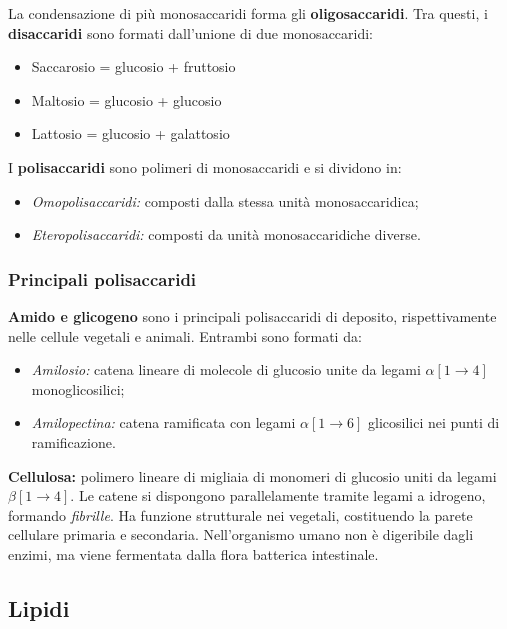 \documentclass[11pt,a4paper,openright,twoside]{book}
\theoremstyle{definition}
\theoremstyle{plain}
\theoremstyle{remark}
\begin{document}
La condensazione di più monosaccaridi forma gli \textbf{oligosaccaridi}. Tra questi, i \textbf{disaccaridi} sono formati dall'unione di due monosaccaridi:
\begin{itemize}
  \item Saccarosio = glucosio + fruttosio
  \item Maltosio = glucosio + glucosio
  \item Lattosio = glucosio + galattosio
\end{itemize}

I \textbf{polisaccaridi} sono polimeri di monosaccaridi e si dividono in:
\begin{itemize}
  \item \textit{Omopolisaccaridi:} composti dalla stessa unità monosaccaridica;
  \item \textit{Eteropolisaccaridi:} composti da unità monosaccaridiche diverse.
\end{itemize}

\subsubsection{Principali polisaccaridi}

\textbf{Amido e glicogeno} sono i principali polisaccaridi di deposito, rispettivamente nelle cellule vegetali e animali. Entrambi sono formati da:
\begin{itemize}
  \item \textit{Amilosio:} catena lineare di molecole di glucosio unite da legami $\alpha[1\!\to\!4]$ monoglicosilici;
  \item \textit{Amilopectina:} catena ramificata con legami $\alpha[1\!\to\!6]$ glicosilici nei punti di ramificazione.
\end{itemize}

\textbf{Cellulosa:} polimero lineare di migliaia di monomeri di glucosio uniti da legami $\beta[1\!\to\!4]$. Le catene si dispongono parallelamente tramite legami a idrogeno, formando \textit{fibrille}. Ha funzione strutturale nei vegetali, costituendo la parete cellulare primaria e secondaria. Nell'organismo umano non è digeribile dagli enzimi, ma viene fermentata dalla flora batterica intestinale.

\subsection{Lipidi}
\end{document}
